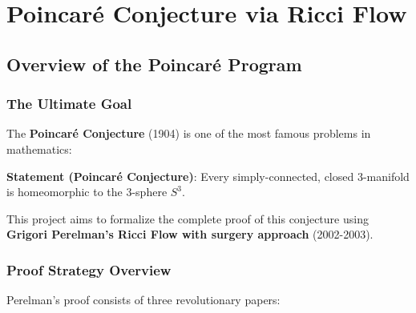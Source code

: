 
\part{Poincaré Conjecture via Ricci Flow}
\label{part:poincare}

\chapter{Overview of the Poincaré Program}
\label{chap:poincare_overview}

\section{The Ultimate Goal}

The \textbf{Poincaré Conjecture} (1904) is one of the most famous problems in mathematics:

\textbf{Statement (Poincaré Conjecture)}: Every simply-connected, closed 3-manifold is homeomorphic to the 3-sphere $S^3$.

This project aims to formalize the complete proof of this conjecture using \textbf{Grigori Perelman's Ricci Flow with surgery approach} (2002-2003).

\section{Proof Strategy Overview}

Perelman's proof consists of three revolutionary papers:

